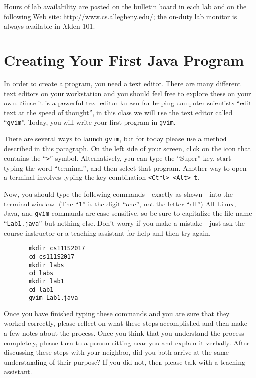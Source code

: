 \documentclass[11pt]{article}
\begin{document}
Hours of lab availability are posted on the bulletin board in each lab and on the following Web site:
\url{http://www.cs.allegheny.edu/}; the on-duty lab monitor is always available in Alden 101.

\section*{Creating Your First Java Program}

In order to create a program, you need a text editor. There are many different text editors on your workstation and
you should feel free to explore these on your own. Since it is a powerful text editor known for helping computer
scientists ``edit text at the speed of thought'', in this class we will use the text editor called ``{\tt gvim}''.
Today, you will write your first program in {\tt gvim}.

There are several ways to launch {\tt gvim}, but for today please use a method described in this paragraph.  On the
left side of your screen, click on the icon that contains the ``{\tt >}'' symbol.  Alternatively, you can type the
``Super'' key, start typing the word ``terminal'', and then select that program.  Another way to open a terminal
involves typing the key combination {\tt <Ctrl>-<Alt>-t}.


Now, you should type the following commands---exactly as shown---into the terminal window.  (The ``{\tt 1}'' is the
  digit ``one'', not the letter ``ell.'') All Linux, Java, and {\tt gvim} commands are case-sensitive, so be sure to
capitalize the file name ``{\tt Lab1.java}'' but nothing else.  Don't worry if you make a mistake---just ask the course
instructor or a teaching assistant for help and then try again.

\vspace*{-.1in}
\begin{verbatim}
       mkdir cs111S2017
       cd cs111S2017
       mkdir labs
       cd labs
       mkdir lab1
       cd lab1
       gvim Lab1.java
\end{verbatim}
\vspace*{-.1in}

Once you have finished typing these commands and you are sure that they worked correctly, please reflect on what these
steps accomplished and then make a few notes about the process. Once you think that you understand the process
completely, please turn to a person sitting near you and explain it verbally. After discussing these steps with your
neighbor, did you both arrive at the same understanding of their purpose? If you did not, then please talk with a
teaching assistant.
\end{document}
